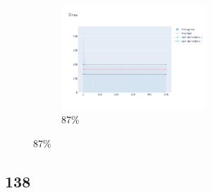 \documentclass[12pt, fleqn]{report}                             %
\theoremstyle{break}                                            %
\begin{document}
\begin{figure}[ht!]
\begin{subfigure}[b]{0.4\linewidth}
          \includegraphics[width=0.6\textwidth]{Images/134/dia-d.png}
          \caption{87\%}
        \end{subfigure}
      \end{figure}


      \clearpage
      \subsection{138}
\end{document}
